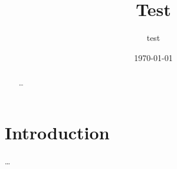 \documentclass{article}
\title{Test}
\author{test}
\date{\today}
\begin{document}
\maketitle

\begin{abstract}
  \ldots
\end{abstract}


\section{Introduction}

\ldots\ \cite{ssb-protocol-guide-2018}


% 



\end{document}
